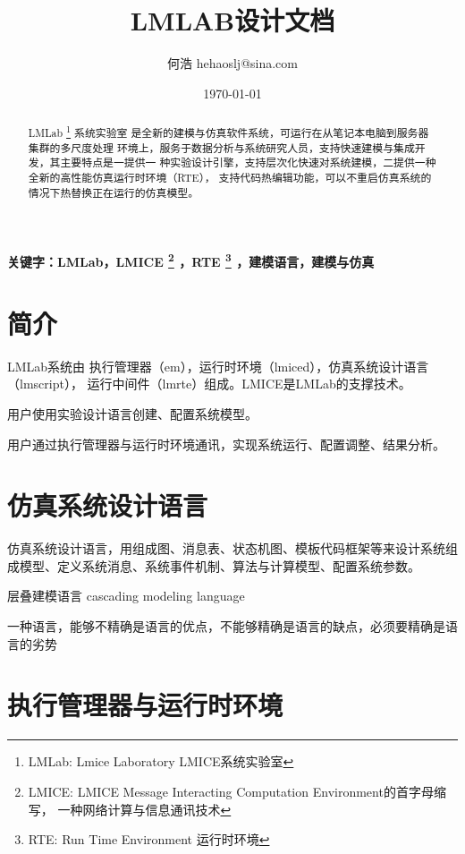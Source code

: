 \documentclass[UTF8, 10pt, a4paper]{ctexart}
\title{LMLAB设计文档}
\author{何浩 hehaoslj@sina.com}
\date{\today}
\begin{document}
\maketitle

\begin{abstract}

LMLab \footnote{LMLab: Lmice Laboratory LMICE系统实验室} 系统实验室
是全新的建模与仿真软件系统，可运行在从笔记本电脑到服务器集群的多尺度处理
环境上，服务于数据分析与系统研究人员，支持快速建模与集成开发，其主要特点是一提供一
种实验设计引擎，支持层次化快速对系统建模，二提供一种全新的高性能仿真运行时环境（RTE），
支持代码热编辑功能，可以不重启仿真系统的情况下热替换正在运行的仿真模型。

\end{abstract}

\textbf{\normalsize 关键字：LMLab，LMICE \footnote{LMICE: LMICE Message Interacting Computation Environment的首字母缩写，
一种网络计算与信息通讯技术}
，RTE \footnote{RTE: Run Time Environment 运行时环境}
，建模语言，建模与仿真}


\tableofcontents

\section {简介}


LMLab系统由 执行管理器（em），运行时环境（lmiced），仿真系统设计语言（lmscript），
运行中间件（lmrte）组成。LMICE是LMLab的支撑技术。

用户使用实验设计语言创建、配置系统模型。

用户通过执行管理器与运行时环境通讯，实现系统运行、配置调整、结果分析。

\section{仿真系统设计语言}

仿真系统设计语言，用组成图、消息表、状态机图、模板代码框架等来设计系统组成模型、定义系统消息、系统事件机制、算法与计算模型、配置系统参数。

层叠建模语言 cascading modeling language

一种语言，能够不精确是语言的优点，不能够精确是语言的缺点，必须要精确是语言的劣势

\section{执行管理器与运行时环境}
\end{document}
